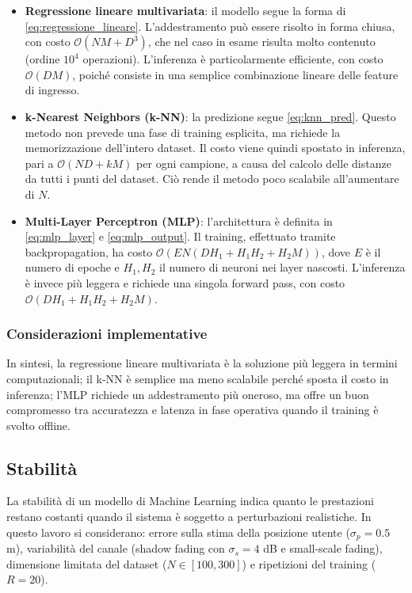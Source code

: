 \documentclass[12pt,a4paper]{report}
\begin{document}
\begin{itemize}
  \item \textbf{Regressione lineare multivariata}: il modello segue la
    forma di \eqref{eq:regressione_lineare}. L'addestramento può essere
    risolto in forma chiusa, con costo
    $\mathcal{O}(NM + D^3)$, che nel caso in esame risulta molto
    contenuto (ordine $10^4$ operazioni).
    L'inferenza è particolarmente efficiente, con costo
    $\mathcal{O}(DM)$, poiché consiste in una semplice combinazione
    lineare delle feature di ingresso.

  \item \textbf{k-Nearest Neighbors (k-NN)}: la predizione segue
    \eqref{eq:knn_pred}. Questo metodo non prevede una fase di training
    esplicita, ma richiede la memorizzazione dell'intero dataset.
    Il costo viene quindi spostato in inferenza, pari a
    $\mathcal{O}(ND + kM)$ per ogni campione, a causa del calcolo delle
    distanze da tutti i punti del dataset. Ciò rende il metodo poco
    scalabile all'aumentare di $N$.

  \item \textbf{Multi-Layer Perceptron (MLP)}: l'architettura è definita
    in \eqref{eq:mlp_layer} e \eqref{eq:mlp_output}. Il training,
    effettuato tramite backpropagation, ha costo
    $\mathcal{O}\!\left(E N (D H_1 + H_1 H_2 + H_2 M)\right)$, dove
    $E$ è il numero di epoche e $H_1, H_2$ il numero di neuroni nei
    layer nascosti.
    L'inferenza è invece più leggera e richiede una singola forward
    pass, con costo
    $\mathcal{O}(D H_1 + H_1 H_2 + H_2 M)$.
\end{itemize}

\subsubsection{Considerazioni implementative}
In sintesi, la regressione lineare multivariata \`e la soluzione
pi\`u leggera in
termini computazionali; il k-NN \`e semplice ma meno scalabile perch\'e
sposta il costo in inferenza; l'MLP richiede un addestramento pi\`u
oneroso, ma offre un buon compromesso tra accuratezza e latenza in
fase operativa quando il training \`e svolto offline.

\subsection{Stabilità}
La stabilità di un modello di Machine Learning indica quanto le
prestazioni restano costanti quando il sistema è soggetto a
perturbazioni realistiche. In questo lavoro si considerano: errore
sulla stima della posizione utente ($\sigma_p = 0.5$ m), variabilità
del canale (shadow fading con $\sigma_s = 4$ dB e small-scale fading),
dimensione limitata del dataset ($N \in [100,300]$) e ripetizioni del
training ($R=20$).
\end{document}
